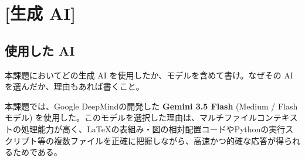 \documentclass[11pt,a4paper,dvipdfmx]{article}
\numberwithin{equation}{section}
\newenvironment{note}[0]
{
    \begin{tcolorbox}[sharp corners, colframe=gray!20, colback=gray!20, width=\textwidth]
}
{
    \end{tcolorbox}
}
\begin{document}
\section*{[生成 AI]}

\subsection*{使用した AI}
\begin{note}
本課題においてどの生成 AI を使用したか、モデルを含めて書け。なぜその AI を選んだか、理由もあれば書くこと。
\end{note}
\begin{proofbox}
本課題では、Google DeepMindの開発した \textbf{Gemini 3.5 Flash} (Medium / Flashモデル) を使用した。このモデルを選択した理由は、マルチファイルコンテキストの処理能力が高く、LaTeXの表組み・図の相対配置コードやPythonの実行スクリプト等の複数ファイルを正確に把握しながら、高速かつ的確な応答が得られるためである。
\end{proofbox}
\end{document}
